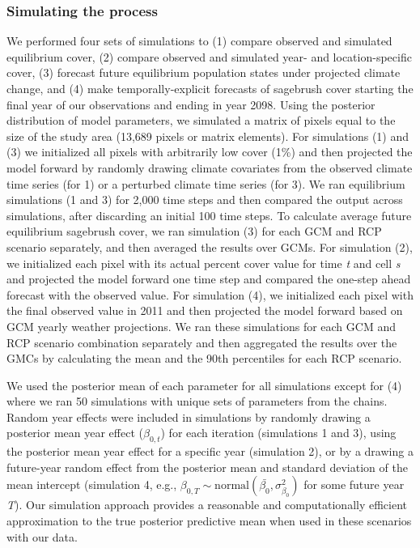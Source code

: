 \documentclass[12pt,]{article}
\begin{document}
\subsubsection{Simulating the process}\label{simulating-the-process}

We performed four sets of simulations to (1) compare observed and
simulated equilibrium cover, (2) compare observed and simulated year-
and location-specific cover, (3) forecast future equilibrium population
states under projected climate change, and (4) make temporally-explicit
forecasts of sagebrush cover starting the final year of our observations
and ending in year 2098. Using the posterior distribution of model
parameters, we simulated a matrix of pixels equal to the size of the
study area (13,689 pixels or matrix elements). For simulations (1) and
(3) we initialized all pixels with arbitrarily low cover (1\%) and then
projected the model forward by randomly drawing climate covariates from
the observed climate time series (for 1) or a perturbed climate time
series (for 3). We ran equilibrium simulations (1 and 3) for 2,000 time
steps and then compared the output across simulations, after discarding
an initial 100 time steps. To calculate average future equilibrium
sagebrush cover, we ran simulation (3) for each GCM and RCP scenario
separately, and then averaged the results over GCMs. For simulation (2),
we initialized each pixel with its actual percent cover value for time
\emph{t} and cell \emph{s} and projected the model forward one time step
and compared the one-step ahead forecast with the observed value. For
simulation (4), we initialized each pixel with the final observed value
in 2011 and then projected the model forward based on GCM yearly weather
projections. We ran these simulations for each GCM and RCP scenario
combination separately and then aggregated the results over the GMCs by
calculating the mean and the 90th percentiles for each RCP scenario.

We used the posterior mean of each parameter for all simulations except
for (4) where we ran 50 simulations with unique sets of parameters from
the chains. Random year effects were included in simulations by randomly
drawing a posterior mean year effect (\(\beta_{0,t}\)) for each
iteration (simulations 1 and 3), using the posterior mean year effect
for a specific year (simulation 2), or by a drawing a future-year random
effect from the posterior mean and standard deviation of the mean
intercept (simulation 4, e.g.,
\(\beta_{0,T} \sim \text{normal}(\bar{\beta_{0}}, \sigma_{\beta_{0}}^2)\)
for some future year \emph{T}). Our simulation approach provides a
reasonable and computationally efficient approximation to the true
posterior predictive mean when used in these scenarios with our data.
\end{document}
